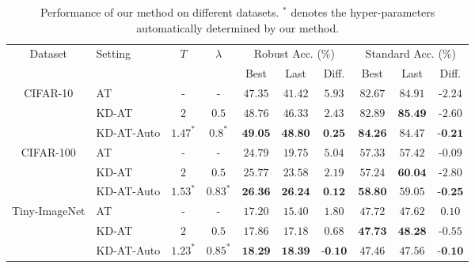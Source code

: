 


\begin{table}[!t]
  \small
  \caption{Performance of our method on different datasets. $^*$ denotes the hyper-parameters automatically determined by our method. %
   }
  \vspace{0.5ex}
  \label{table:result-dataset}
  \centering
  \small
  \begin{tabular}{clcccccccc}
    \toprule
    \multirow{2}{*}{Dataset} & \multirow{2}{*}{Setting} & \multirow{2}{*}{$T$} & \multirow{2}{*}{$\lambda$} & \multicolumn{3}{c}{Robust Acc. (\%)} & \multicolumn{3}{c}{Standard Acc. (\%)}\\
     & & &  & Best & Last & Diff. & Best & Last & Diff.\\
    \midrule
\multirow{3}{*}{CIFAR-10} 
& AT & - & - &  $47.35$ & $41.42$ & $ 5.93$ &  $82.67$ &  $84.91$ & -$2.24$ \\
 & KD-AT & $2$ & $0.5$ &  $48.76$ & $46.33$ & $ 2.43$ &  $82.89$ &  $\textbf{85.49}$ & -$2.60$ \\ 
 & KD-AT-Auto & $1.47^*$ & $0.8^*$ &  $\textbf{49.05}$ & $\textbf{48.80}$ & $ \textbf{0.25}$ &  $\textbf{84.26}$ &  $84.47$ & $\textbf{-0.21}$ \\ 
    \midrule
\multirow{3}{*}{CIFAR-100}
& AT & - & - &  $24.79$ & $19.75$ & $ 5.04$ &  $57.33$ &  $57.42$ & -$0.09$ \\ 
& KD-AT & $2$ & $0.5$ &  $25.77$ & $23.58$ & $ 2.19$ &  $57.24$ &  $\textbf{60.04}$ & -$2.80$ \\ 
& KD-AT-Auto & $1.53^*$ & $0.83^*$ &  $\textbf{26.36}$ & $\textbf{26.24}$ & $\textbf{0.12}$ &  $\textbf{58.80}$ &  $59.05$ & $\textbf{-0.25}$ \\ 
\midrule
\multirow{3}{*}{Tiny-ImageNet} 
& AT & - & - &  $17.20$ & $15.40$ & $ 1.80$ &  $47.72$ &  $47.62$ & $ 0.10$ \\ 
& KD-AT & $2$ & $0.5$ &  $17.86$ & $17.18$ & $ 0.68$ &  $\textbf{47.73}$ &  $\textbf{48.28}$ & -$0.55$ \\ 
& KD-AT-Auto  & $1.23^*$ & $0.85^*$ &  $\textbf{18.29}$ & $\textbf{18.39}$ & $\textbf{-0.10}$ &  $47.46$ &  $47.56$ & $\textbf{-0.10}$ \\ 
    \bottomrule
  \end{tabular}
\end{table}


